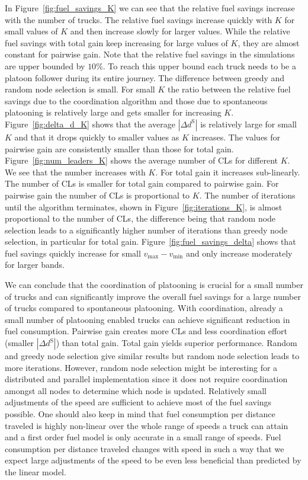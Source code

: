 \documentclass[letterpaper,10pt,conference,twocolumn]{IEEEtran}
\newcommand{\op}[1]{\mathrm{#1}}
\theoremstyle{definition}
\begin{document}
In Figure~\ref{fig:fuel_savings_K} we can see that the relative fuel savings increase with the number of trucks. The relative fuel savings increase quickly with $K$ for small values of $K$ and then increase slowly for larger values. While the relative fuel savings with total gain keep increasing for large values of $K$, they are almost constant for pairwise gain. Note that the relative fuel savings in the simulations are upper bounded by $10 \%$. To reach this upper bound each truck needs to be a platoon follower during its entire journey. The difference between greedy and random node selection is small. For small $K$ the ratio between the relative fuel savings due to the coordination algorithm and those due to spontaneous platooning is relatively large and gets smaller for increasing $K$. Figure~\ref{fig:delta_d_K} shows that the average $|\Delta d^\op{S}|$ is relatively large for small $K$ and that it drops quickly to smaller values as $K$ increases. The values for pairwise gain are consistently smaller than those for total gain. 
Figure~\ref{fig:num_leaders_K} shows the average number of CLs for different $K$. We see that the number increases with $K$. For total gain it increases sub-linearly. The number of CLs is smaller for total gain compared to pairwise gain. For pairwise gain the number of CLs is proportional to $K$. The number of iterations until the algorithm terminates, shown in Figure~\ref{fig:iterations_K}, is almost proportional to the number of CLs, the difference being that random node selection leads to a significantly higher number of iterations than greedy node selection, in particular for total gain. 
Figure~\ref{fig:fuel_savings_delta} shows that fuel savings quickly increase for small $v_{\max} -v_{\min}$ and only increase moderately for larger bands. 


We can conclude that the coordination of platooning is crucial for a small number of trucks and can significantly improve the overall fuel savings for a large number of trucks compared to spontaneous platooning. With coordination, already a small number of platooning enabled trucks can achieve significant reduction in fuel consumption. Pairwise gain creates more CLs and less coordination effort (smaller $|\Delta d^\op{S}|$) than total gain. Total gain yields superior performance. Random and greedy node selection give similar results but random node selection leads to more iterations. However, random node selection might be interesting for a distributed and parallel implementation since it does not require coordination amongst all nodes to determine which node is updated. 
Relatively small adjustments of the speed are sufficient to achieve most of the fuel savings possible. One should also keep in mind that fuel consumption per distance traveled is highly non-linear over the whole range of speeds a truck can attain and a first order fuel model is only accurate in a small range of speeds. 
Fuel consumption per distance traveled changes with speed in such a way that we expect large adjustments of the speed to be even less beneficial than predicted by the linear model.
\end{document}
